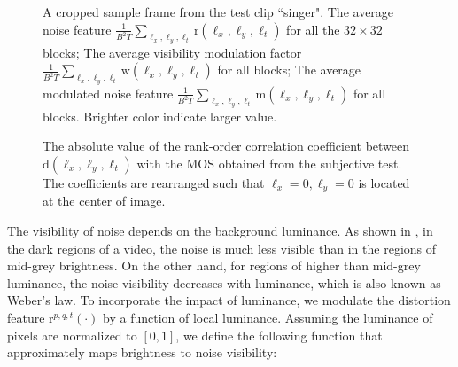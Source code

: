 \documentclass{sig-alternate}
\begin{document}
\begin{figure}[htp]
{\label{fig:m_feature}}
\caption{\label{fig:noise_visibility} A cropped sample frame from the test clip ``singer".  The average noise feature $\frac{1}{B^2T}\sum_{\ell_x,\ell_y,\ell_t}\mathrm{r}(\ell_x,\ell_y,\ell_t)$ for all the $32\times32$ blocks;
 The average visibility modulation factor $\frac{1}{B^2T}\sum_{\ell_x,\ell_y,\ell_t}\mathrm{w}(\ell_x,\ell_y,\ell_t)$ for all blocks;
 The average modulated noise feature $\frac{1}{B^2T}\sum_{\ell_x,\ell_y,\ell_t}\mathrm{m}(\ell_x,\ell_y,\ell_t)$ for all blocks. Brighter color indicate larger value.
} 
\end{figure}

\begin{figure}
\caption{\label{fig:correlation_map}The absolute value of the rank-order correlation coefficient between $\mathrm{d}(\ell_x,\ell_y,\ell_t)$ with the MOS obtained from the subjective test. The coefficients are rearranged such that $\ell_x=0,\ell_y=0$ is located at the center of image.}
\end{figure}
The visibility of noise depends on the background luminance. As shown in \cite{ChoLi1995,Gir1989}, in the dark regions of a video, the noise is much less visible than in the regions of mid-grey brightness. On the other hand, for regions of higher than mid-grey luminance, the noise visibility decreases with luminance, which is also known as Weber's law. To incorporate the impact of luminance, we modulate the distortion feature $\mathrm{r}^{p,q,t}(\cdot)$ by a function of local luminance. Assuming the luminance of pixels are normalized to $[0,1]$, we define the following function that approximately maps brightness to noise visibility: 
\end{document}
